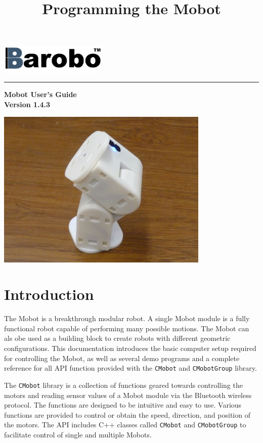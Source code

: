 \documentclass{article}
\title{Programming the Mobot}
\begin{document}
\includegraphics[width=2in]{images/Barobo.png}
\hrule
\begin{center}
\vspace*{2.5cm}
{\Huge\sf\bf Mobot User's Guide}\\
\vspace*{2.5cm}
{\Large\bf Version 1.4.3}
\vspace{4.5cm}

\includegraphics[width=4in]{images/Mobot_Camera_Stand.JPG}
\end{center}


\newpage
\tableofcontents
\newpage
\section{Introduction}
The Mobot is a breakthrough modular robot. A single Mobot module is a fully 
functional robot capable of performing many possible motions. The Mobot
can als obe used as a building block to create robots with different
geometric configurations. 
This documentation introduces the basic computer setup required for controlling 
the Mobot, as well as several demo programs and a complete reference for all
API function provided with the \texttt{CMobot} and \texttt{CMobotGroup} library.

The \texttt{CMobot} library is a collection of functions geared towards
controlling the motors and reading sensor values of a Mobot module via the
Bluetooth wireless protocol. The functions are designed to be intuitive
and easy to use. Various functions are provided to control or obtain the speed,
direction, and position of the motors. The API includes C++ classes called
\texttt{CMobot} and \texttt{CMobotGroup} to facilitate control of 
single and multiple Mobots.
\end{document}
